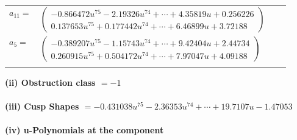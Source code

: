\documentclass[1p]{elsarticle_modified}
\theoremstyle{definition}
\begin{document}
\begin{tabular}{m{7pt} m{180pt} m{7pt} m{180pt} }
\flushright $a_{11}=$&$\begin{pmatrix}-0.866472 u^{75}-2.19326 u^{74}+\cdots+4.35819 u+0.256226\\0.137653 u^{75}+0.177442 u^{74}+\cdots+6.46899 u+3.72188\end{pmatrix}$ \\
\flushright $a_{5}=$&$\begin{pmatrix}-0.389207 u^{75}-1.15743 u^{74}+\cdots+9.42404 u+2.44734\\0.260915 u^{75}+0.504172 u^{74}+\cdots+7.97047 u+4.09188\end{pmatrix}$\\&\end{tabular}
\flushleft \textbf{(ii) Obstruction class $= -1$}\\~\\
\flushleft \textbf{(iii) Cusp Shapes $= -0.431038 u^{75}-2.36353 u^{74}+\cdots+19.7107 u-1.47053$}\\~\\
\newpage\renewcommand{\arraystretch}{1}
\flushleft \textbf{(iv) u-Polynomials at the component}\newline \\
\end{document}

